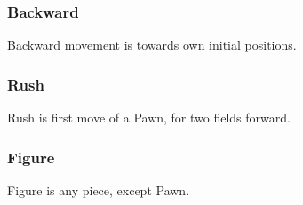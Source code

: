 \subsubsection*{Backward}
\label{sec:Classical Chess/Variants/Terms/Backward}
Backward movement is towards own initial positions.

\subsubsection*{Rush}
\label{sec:Classical Chess/Variants/Terms/Rush}
Rush is first move of a Pawn, for two fields forward.

\subsubsection*{Figure}
\label{sec:Classical Chess/Variants/Terms/Figure}
Figure is any piece, except Pawn.

\clearpage %
